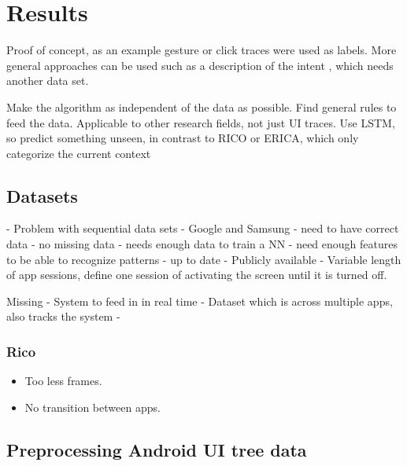 \chapter{Results}

Proof of concept, as an example gesture or click traces were used as labels.
More general approaches can be used such as a description of the intent \cite{screen2words}, which needs another data set.

Make the algorithm as independent of the data as possible.
Find general rules to feed the data.
Applicable to other research fields, not just UI traces.
Use LSTM, so predict something unseen, in contrast to RICO or ERICA, which only categorize the current context


\section{Datasets}

- Problem with sequential data sets
- Google and Samsung
- need to have correct data
- no missing data
- needs enough data to train a NN
- need enough features to be able to recognize patterns
- up to date
- Publicly available
- Variable length of app sessions, define one session of activating the screen until it is turned off.

Missing
- System to feed in in real time
- Dataset which is across multiple apps, also tracks the system
-

\subsection{Rico}

\begin{itemize}
  \item Too less frames.
  \item No transition between apps.
\end{itemize}

\section{Preprocessing Android UI tree data}
